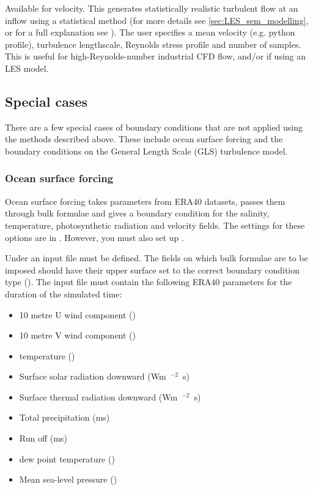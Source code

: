  Available for velocity.
This generates statistically realistic turbulent flow at an inflow using a
statistical method (for more details see \ref{sec:LES_sem_modelling}, or for a full explanation see \cite{jarrin_06}).
The user specifies a mean velocity (e.g. python profile),
turbulence lengthscale, Reynolds stress profile and number of samples.
This is useful for high-Reynolds-number industrial CFD flow, and/or if using an LES model.

\subsection{Special cases}\label{sec:BCs:special}

There are a few special cases of boundary conditions that are not applied
using the methods described above.  These include ocean surface forcing and
the boundary conditions on the General Length Scale (GLS) turbulence model.

\subsubsection{Ocean surface forcing}\label{sec:BCs:special:oceans}

Ocean surface forcing takes parameters from ERA40 datasets, passes them
through bulk formulae and gives a boundary condition for the salinity,
temperature, photosynthetic radiation and velocity fields. The settings for
these options are in . However, you must also set up
.

Under  an input file must be defined. The fields on 
which bulk formulae are to be imposed should have their upper surface set to the correct
boundary condition type ().
The input file must contain the following ERA40 parameters for the
duration of the simulated time:
\begin{itemize}
 \item 10 metre U wind component (\ms)
 \item 10 metre V wind component (\ms)
 \item \m[2] temperature (\K)
 \item Surface solar radiation downward (\unit{Wm\ensuremath{^{-2}}s})
 \item Surface thermal radiation downward (\unit{Wm\ensuremath{^{-2}}s})
 \item Total precipitation (\unit{ms})
 \item Run off (\unit{ms})
 \item \m[2] dew point temperature (\K)
 \item Mean sea-level pressure (\Pa)
\end{itemize}

